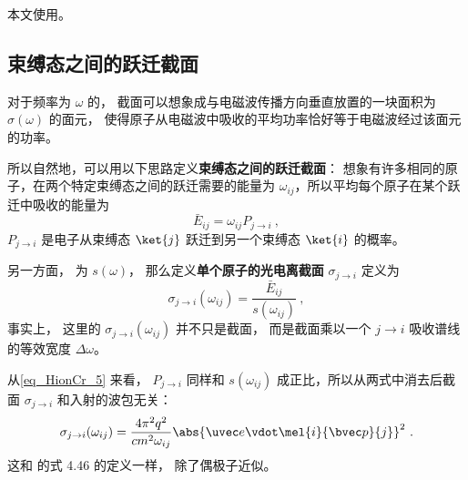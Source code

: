 
本文使用。

\subsection{束缚态之间的跃迁截面}
对于频率为 $\omega$ 的， 截面可以想象成与电磁波传播方向垂直放置的一块面积为 $\sigma(\omega)$ 的面元， 使得原子从电磁波中吸收的平均功率恰好等于电磁波经过该面元的功率。

所以自然地，可以用以下思路定义\textbf{束缚态之间的跃迁截面}： 想象有许多相同的原子，在两个特定束缚态之间的跃迁需要的能量为 $\omega_{ij}$，所以平均每个原子在某个跃迁中吸收的能量为
\begin{equation}
\bar E_{ij} = \omega_{ij}P_{j\to i}~,
\end{equation}
$P_{j\to i}$ 是电子从束缚态 $\ket{j}$ 跃迁到另一个束缚态 $\ket{i}$ 的概率。

另一方面， 为 $s(\omega)$， 那么定义\textbf{单个原子的光电离截面} $\sigma_{j\to i}$ 定义为
\begin{equation}
\sigma_{j\to i}(\omega_{ij}) = \frac{\bar E_{ij}}{s(\omega_{ij})}~,
\end{equation}
事实上， 这里的 $\sigma_{j\to i}(\omega_{ij})$ 并不只是截面， 而是截面乘以一个 $j\to i$ 吸收谱线的等效宽度 $\Delta \omega$。

从\autoref{eq_HionCr_5}  来看， $P_{j\to i}$ 同样和 $s(\omega_{ij})$ 成正比，所以从两式中消去后截面 $\sigma_{j\to i}$ 和入射的波包无关：
\begin{equation}
\sigma_{j\to i}(\omega_{ij}) = \frac{4\pi^2 q^2}{c m^2 \omega_{ij}} \abs{\uvec e \vdot\mel{i}{\bvec p}{j}}^2~.
\end{equation}
这和 \cite{Bransden} 的式 4.46 的定义一样， 除了偶极子近似。

